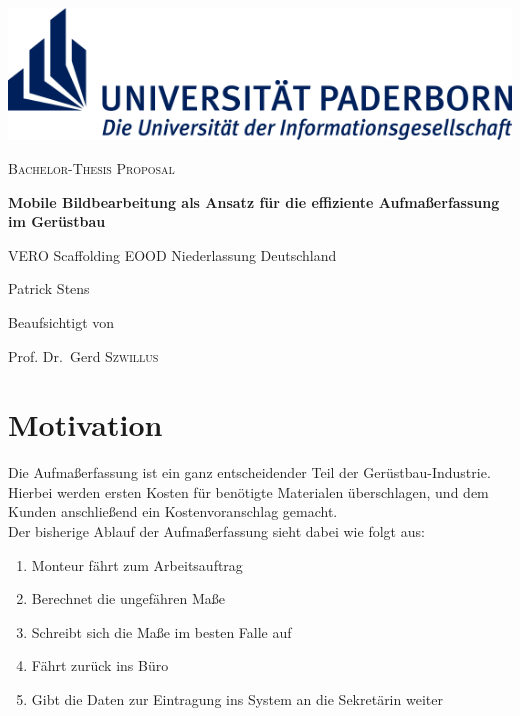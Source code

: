\documentclass[a4paper]{article}
\begin{document}
\renewcommand{\refname}{Literatur}

\begin{titlepage}
	\centering
	\includegraphics[width=\textwidth]{logo}
	\par\vspace{5cm}

	{\scshape\Large Bachelor-Thesis Proposal\par}
	\vspace{1cm}

	{\huge\bfseries Mobile Bildbearbeitung als Ansatz für die effiziente Aufmaßerfassung im Gerüstbau\par}
	\vspace{2cm}

	{\large VERO Scaffolding EOOD Niederlassung Deutschland\par}

	{\Large Patrick Stens\par}

	\vfill

	Beaufsichtigt von\par
	Prof. Dr.~Gerd \textsc{Szwillus}	

\end{titlepage}

\section*{Motivation}
Die Aufmaßerfassung ist ein ganz entscheidender Teil der Gerüstbau-Industrie. 
Hierbei werden ersten Kosten für benötigte Materialen überschlagen, und dem Kunden anschließend ein Kostenvoranschlag gemacht. \\ 
Der bisherige Ablauf der Aufmaßerfassung sieht dabei wie folgt aus:
\begin{enumerate}
	\item Monteur fährt zum Arbeitsauftrag 
	\item Berechnet die ungefähren Maße
	\item Schreibt sich die Maße im besten Falle auf
	\item Fährt zurück ins Büro
	\item Gibt die Daten zur Eintragung ins System an die Sekretärin weiter
\end{enumerate}
\end{document}

